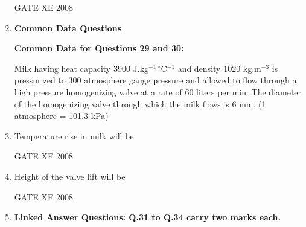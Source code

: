 \documentclass[12pt]{article}
\begin{document}
\begin{enumerate}
\begin{enumerate}
\end{enumerate}
GATE XE 2008  

\item[] \textbf{\Large Common Data Questions}

\textbf{Common Data for Questions 29 and 30:} 

Milk having heat capacity $3900$ J.kg$^{-1} \, ^\circ$C$^{-1}$ and density $1020$ kg.m$^{-3}$ is pressurized to 300 atmosphere gauge pressure and allowed to flow through a high pressure homogenizing valve at a rate of 60 liters per min. The diameter of the homogenizing valve through which the milk flows is 6 mm. (1 atmosphere = 101.3 kPa)  

\item Temperature rise in milk will be  

\begin{enumerate}
\end{enumerate}

GATE XE 2008  

\item Height of the valve lift will be  

\begin{enumerate}
\end{enumerate}

GATE XE 2008  

\item[] \textbf{\Large Linked Answer Questions: Q.31 to Q.34 carry two marks each.}


\end{enumerate}
\end{document}
